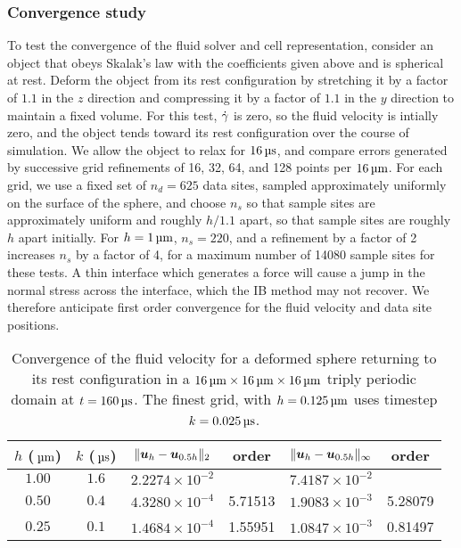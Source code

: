 \subsubsection{Convergence study}
To test the convergence of the fluid solver and cell representation, consider 
an object that obeys Skalak's law with the coefficients given above and is
spherical at rest. Deform the object from its rest configuration by stretching
it by a factor of $1.1$ in the $z$ direction and compressing it by a factor of
$1.1$ in the $y$ direction to maintain a fixed volume. For this test, $\dot{\gamma}$
is zero, so the fluid velocity is intially zero, and the object tends toward
its rest configuration over the course of simulation. We allow the object to
relax for $16\us$, and compare errors generated by successive grid refinements
of 16, 32, 64, and 128 points per $16\um$. For each grid, we use a fixed set of
$n_d=625$ data sites, sampled approximately uniformly on the surface of the
sphere, and choose $n_s$ so that sample sites are approximately uniform and
roughly $h/1.1$ apart, so that sample sites are roughly $h$ apart initially.
For $h=1\um$, $n_s=220$, and a refinement by a factor of 2 increases $n_s$ by a
factor of 4, for a maximum number of 14080 sample sites for these tests. A thin
interface which generates a force will cause a jump in the normal stress across
the interface, which the IB method may not recover. We therefore anticipate
first order convergence for the fluid velocity and data site positions.

\begin{table*}[ht]
    \caption{%
Convergence of the fluid velocity for a deformed sphere returning to its rest
configuration in a $16\um\times16\um\times16\um$ triply periodic domain at
$t=160\us$. The finest grid, with $h=0.125\um$ uses timestep $k=0.025\us$.
    }\label{tab:u-convergence}
    \begin{center}
        \begingroup
        \setlength{\tabcolsep}{9pt}
        \renewcommand{\arraystretch}{1.5}
        \begin{tabular}{cc|cc|cc}
                                                                                                                    \\ \toprule
            $h$ ($\um$) & $k$ ($\us$) & $\|\boldsymbol{u}_h-\boldsymbol{u}_{0.5h}\|_2$ & order   & $\|\boldsymbol{u}_h-\boldsymbol{u}_{0.5h}\|_{\infty}$ & order    \\ \midrule
            $1.00$      & $1.6$       & $2.2274\times10^{-2}$  &         & $7.4187\times10^{-2}$         &          \\
            $0.50$      & $0.4$       & $4.3280\times10^{-4}$  & 5.71513 & $1.9083\times10^{-3}$         & 5.28079  \\
            $0.25$      & $0.1$       & $1.4684\times10^{-4}$  & 1.55951 & $1.0847\times10^{-3}$         & 0.81497  \\ \bottomrule
        \end{tabular}
        \endgroup
    \end{center}
\end{table*}

